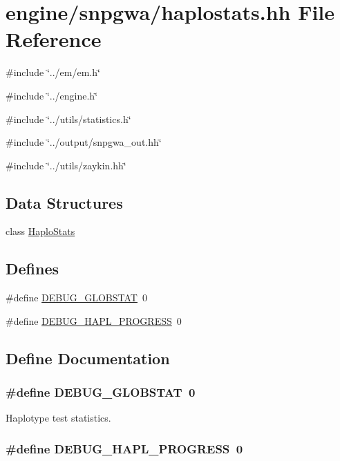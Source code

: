 \hypertarget{haplostats_8hh}{
\section{engine/snpgwa/haplostats.hh File Reference}
\label{haplostats_8hh}
}
{\ttfamily \#include \char`\"{}../em/em.h\char`\"{}}\par
{\ttfamily \#include \char`\"{}../engine.h\char`\"{}}\par
{\ttfamily \#include \char`\"{}../utils/statistics.h\char`\"{}}\par
{\ttfamily \#include \char`\"{}../output/snpgwa\_\-out.hh\char`\"{}}\par
{\ttfamily \#include \char`\"{}../utils/zaykin.hh\char`\"{}}\par
\subsection*{Data Structures}
\begin{DoxyCompactItemize}
\item 
class \hyperlink{classHaploStats}{HaploStats}
\end{DoxyCompactItemize}
\subsection*{Defines}
\begin{DoxyCompactItemize}
\item 
\#define \hyperlink{haplostats_8hh_a8556c9fc33195e55279c7720cf15f46d}{DEBUG\_\-GLOBSTAT}~0
\item 
\#define \hyperlink{haplostats_8hh_a0ee56897cf81864a68ee5122b10c8077}{DEBUG\_\-HAPL\_\-PROGRESS}~0
\end{DoxyCompactItemize}


\subsection{Define Documentation}
\hypertarget{haplostats_8hh_a8556c9fc33195e55279c7720cf15f46d}{
\subsubsection[{DEBUG\_\-GLOBSTAT}]{\setlength{\rightskip}{0pt plus 5cm}\#define DEBUG\_\-GLOBSTAT~0}}
\label{haplostats_8hh_a8556c9fc33195e55279c7720cf15f46d}
Haplotype test statistics. \hypertarget{haplostats_8hh_a0ee56897cf81864a68ee5122b10c8077}{
\subsubsection[{DEBUG\_\-HAPL\_\-PROGRESS}]{\setlength{\rightskip}{0pt plus 5cm}\#define DEBUG\_\-HAPL\_\-PROGRESS~0}}
\label{haplostats_8hh_a0ee56897cf81864a68ee5122b10c8077}
